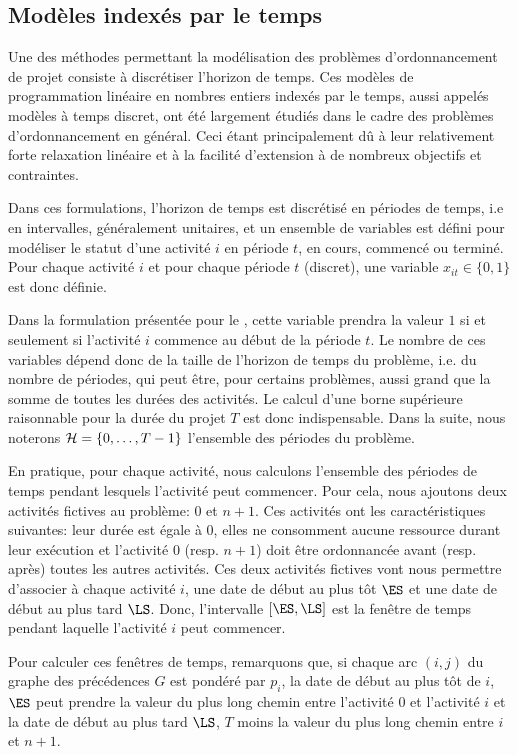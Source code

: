 \subsection{Modèles indexés par le temps}
\label{sec:time_RCPSP}

Une des méthodes permettant la modélisation des problèmes
d'ordonnancement de projet consiste à discrétiser l'horizon de
temps. Ces modèles de programmation linéaire en nombres entiers
indexés par le temps, aussi appelés modèles à temps discret, ont été
largement étudiés dans le cadre des problèmes d'ordonnancement en
général. Ceci étant principalement dû à leur relativement forte
relaxation linéaire et à la facilité d’extension à de nombreux
objectifs et contraintes.

Dans ces formulations, l'horizon de temps est discrétisé en périodes de
temps, i.e en intervalles, généralement unitaires, et un
ensemble de variables est défini pour modéliser le statut d'une
activité $i$ en période $t$, en cours, commencé ou terminé. Pour
chaque activité $i$ et pour chaque période $t$ (discret), une variable
$x_{it} \in \{0,1\}$ est donc définie.

Dans la formulation présentée pour le \RCPSP, cette variable prendra
la valeur $1$ si et seulement si l'activité $i$ commence au début de
la période $t$. Le nombre de ces variables dépend donc de la taille de
l'horizon de temps du problème, i.e. du nombre de périodes, qui peut
être, pour certains problèmes, aussi grand que la somme de toutes les
durées des activités. Le calcul d'une borne supérieure raisonnable
pour la durée du projet $T$ est donc indispensable.  Dans la suite,
nous noterons ${\cal H}=\{0,\dots,T-1\}$ l'ensemble des périodes du
problème.

En pratique, pour chaque activité, nous calculons l'ensemble des
périodes de temps pendant lesquels l'activité peut commencer. Pour
cela, nous ajoutons deux activités fictives au problème: $0$ et
$n+1$. Ces activités ont les caractéristiques suivantes: leur
durée est égale à 0, elles ne consomment aucune ressource durant
leur exécution et l'activité $0$ (resp. $n+1$) doit être
ordonnancée avant (resp. après) toutes les autres activités. Ces
deux activités fictives vont nous permettre d'associer à chaque
activité $i$, une date de début au plus tôt $\ES$ et une date de
début au plus tard $\LS$. Donc, l'intervalle $[\ES,\LS]$ est la
fenêtre de temps pendant laquelle l'activité $i$ peut commencer.

Pour calculer ces fenêtres de temps, remarquons que, si chaque
arc $(i,j)$ du graphe des précédences $G$ est pondéré par
$p_i$, la date de début au plus tôt de $i$, $\ES$ peut prendre la
valeur du plus long chemin entre l'activité $0$ et l'activité $i$
et la date de début au plus tard $\LS$, $T$ moins la valeur du
plus long chemin entre $i$ et $n+1$.

